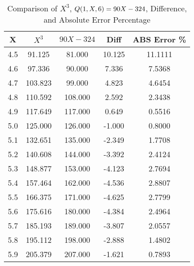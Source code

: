 ﻿%
\begin{table}[h!]
    \centering
    \caption{Comparison of $X^3$, ${Q}(1,X,6) = 90X-324$, Difference, and Absolute Error Percentage}
    \begin{tabular}{|c|c|c|c|c|}
        \hline
        \textbf{X} & \textbf{$X^3$} & \textbf{$90X-324$} & \textbf{Diff} & \textbf{ABS Error \%} \\ \hline
        4.5        & 91.125         & 81.000             & 10.125        & 11.1111               \\ \hline
        4.6        & 97.336         & 90.000             & 7.336         & 7.5368                \\ \hline
        4.7        & 103.823        & 99.000             & 4.823         & 4.6454                \\ \hline
        4.8        & 110.592        & 108.000            & 2.592         & 2.3438                \\ \hline
        4.9        & 117.649        & 117.000            & 0.649         & 0.5516                \\ \hline
        5.0        & 125.000        & 126.000            & -1.000        & 0.8000                \\ \hline
        5.1        & 132.651        & 135.000            & -2.349        & 1.7708                \\ \hline
        5.2        & 140.608        & 144.000            & -3.392        & 2.4124                \\ \hline
        5.3        & 148.877        & 153.000            & -4.123        & 2.7694                \\ \hline
        5.4        & 157.464        & 162.000            & -4.536        & 2.8807                \\ \hline
        5.5        & 166.375        & 171.000            & -4.625        & 2.7799                \\ \hline
        5.6        & 175.616        & 180.000            & -4.384        & 2.4964                \\ \hline
        5.7        & 185.193        & 189.000            & -3.807        & 2.0557                \\ \hline
        5.8        & 195.112        & 198.000            & -2.888        & 1.4802                \\ \hline
        5.9        & 205.379        & 207.000            & -1.621        & 0.7893                \\ \hline

\end{tabular}
\end{table}
